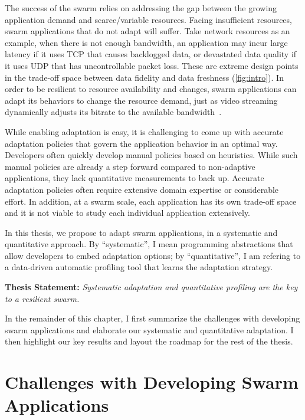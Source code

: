\documentclass[thesis.tex]{subfiles}
\begin{document}
The success of the swarm relies on addressing the gap between the growing
application demand and scarce/variable resources. Facing insufficient resources,
swarm applications that do not adapt will suffer. Take network resources as an
example, when there is not enough bandwidth, an application may incur large
latency if it uses TCP that causes backlogged data, or devastated data quality
if it uses UDP that has uncontrollable packet loss. These are extreme design
points in the trade-off space between data fidelity and data freshness
(\autoref{fig:intro}). In order to be resilient to resource availability and
changes, swarm applications can adapt its behaviors to change the resource
demand, just as video streaming dynamically adjusts its bitrate to the available
bandwidth~\cite{michalos2012dynamic}.

While enabling adaptation is easy, it is challenging to come up with accurate
adaptation policies that govern the application behavior in an optimal
way. Developers often quickly develop manual policies based on heuristics. While
such manual policies are already a step forward compared to non-adaptive
applications, they lack quantitative measurements to back up. Accurate
adaptation policies often require extensive domain expertise or considerable
effort. In addition, at a swarm scale, each application has its own trade-off
space and it is not viable to study each individual application extensively.

In this thesis, we propose to adapt swarm applications, in a systematic and
quantitative approach. By ``systematic'', I mean programming abstractions that
allow developers to embed adaptation options; by ``quantitative'', I am refering
to a data-driven automatic profiling tool that learns the adaptation strategy.

\vspace{1em}

\noindent\textbf{Thesis Statement:} \textit{Systematic adaptation and
  quantitative profiling are the key to a resilient swarm.}

\vspace{1em}

In the remainder of this chapter, I first summarize the challenges with
developing swarm applications and elaborate our systematic and quantitative
adaptation. I then highlight our key results and layout the roadmap for the rest
of the thesis.

\section{Challenges with Developing Swarm Applications}
\label{sec:chall-with-exist}
\end{document}

